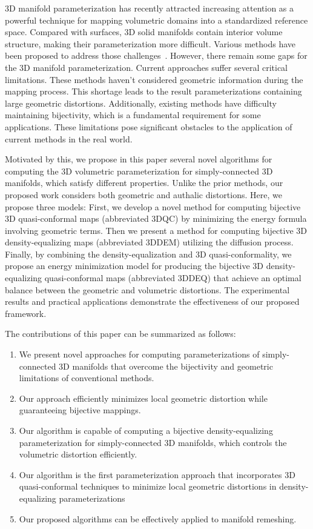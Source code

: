 \documentclass{article}
\begin{document}
3D manifold parameterization has recently attracted increasing attention as a powerful technique for mapping volumetric domains into a standardized reference space. Compared with surfaces, 3D solid manifolds contain interior volume structure, making their parameterization more difficult. Various methods have been proposed to address those challenges~\cite{yueh2019novel,tan2025dimensional,zhang2022unifying,su2017volume}. However, there remain some gaps for the 3D manifold parameterization. Current approaches suffer several critical limitations. These methods haven't considered geometric information during the mapping process. This shortage leads to the result parameterizations containing large geometric distortions. Additionally, existing methods have difficulty maintaining bijectivity, which is a fundamental requirement for some applications. These limitations pose significant obstacles to the application of current methods in the real world.

Motivated by this, we propose in this paper several novel algorithms for computing the 3D volumetric parameterization for simply-connected 3D manifolds, which satisfy different properties. Unlike the prior methods, our proposed work considers both geometric and authalic distortions. Here, we propose three models: First, we develop a novel method for computing bijective 3D quasi-conformal maps (abbreviated 3DQC) by minimizing the energy formula involving geometric terms. Then we present a method for computing bijective 3D density-equalizing maps (abbreviated 3DDEM) utilizing the diffusion process. Finally, by combining the density-equalization and 3D quasi-conformality, we propose an energy minimization model for producing the bijective 3D density-equalizing quasi-conformal maps (abbreviated 3DDEQ) that achieve an optimal balance between the geometric and volumetric distortions. The experimental results and practical applications demonstrate the effectiveness of our proposed framework.

The contributions of this paper can be summarized as follows:
\begin{enumerate}
\item We present novel approaches for computing parameterizations of simply-connected 3D manifolds that overcome the bijectivity and geometric limitations of conventional methods.
\item Our approach efficiently minimizes local geometric distortion while guaranteeing bijective mappings.
\item Our algorithm is capable of computing a bijective density-equalizing parameterization for simply-connected 3D manifolds, which controls the volumetric distortion efficiently. 
\item Our algorithm is the first parameterization approach that incorporates 3D quasi-conformal techniques to minimize local geometric distortions in density-equalizing parameterizations
\item Our proposed algorithms can be effectively applied to manifold remeshing.
\end{enumerate}
\end{document}
